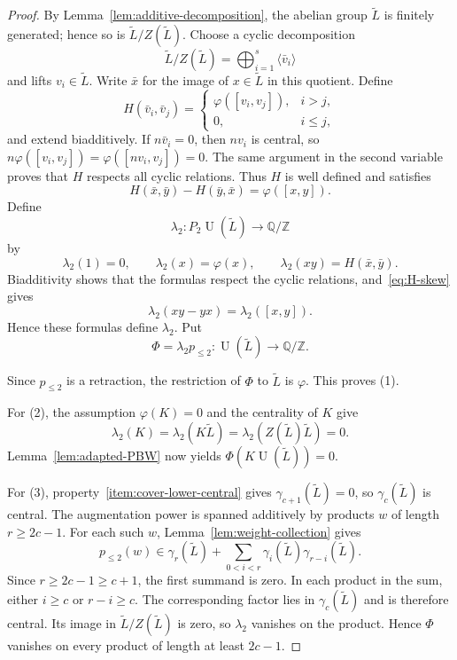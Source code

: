 \documentclass[a4paper,11pt,reqno]{amsart}
\theoremstyle{definition}
\newcommand{\Z}{\mathbb Z}
\newcommand{\Q}{\mathbb Q}
\newcommand{\D}{\Q/\Z}
\newcommand{\U}{\operatorname U}
\begin{document}
\begin{proof}
By Lemma~\ref{lem:additive-decomposition}, the abelian group $\widetilde L$
is finitely generated; hence so is $\widetilde L/Z(\widetilde L)$.  Choose
a cyclic decomposition
\[
 \widetilde L/Z(\widetilde L)
 =\bigoplus_{i=1}^s\langle\bar v_i\rangle
\]
and lifts $v_i\in\widetilde L$.  Write $\bar x$ for the image of
$x\in\widetilde L$ in this quotient.  Define
\[
 H(\bar v_i,\bar v_j)=
 \begin{cases}
  \varphi([v_i,v_j]),&i>j,\\
  0,&i\leq j,
 \end{cases}
\]
and extend biadditively.  If $n\bar v_i=0$, then $nv_i$ is central, so
$n\varphi([v_i,v_j])=\varphi([nv_i,v_j])=0$.  The same argument in the
second variable proves that $H$ respects all cyclic relations.  Thus $H$
is well defined and satisfies
\begin{equation}\label{eq:H-skew}
 H(\bar x,\bar y)-H(\bar y,\bar x)=\varphi([x,y]).
\end{equation}
Define
\[
 \lambda_2:P_2\U(\widetilde L)\longrightarrow\D
\]
by
\[
 \lambda_2(1)=0,
 \qquad
 \lambda_2(x)=\varphi(x),
 \qquad
 \lambda_2(xy)=H(\bar x,\bar y).
\]
Biadditivity shows that the formulas respect the cyclic relations,
and~\eqref{eq:H-skew} gives
\[
                  \lambda_2(xy-yx)=\lambda_2([x,y]).
\]
Hence these formulas define $\lambda_2$.  Put
\[
 \Phi=\lambda_2p_{\leq2}:
 \U(\widetilde L)\longrightarrow\D.
\]

Since $p_{\leq2}$ is a retraction, the restriction of
$\Phi$ to $\widetilde L$ is $\varphi$.  This proves (1).

For (2), the assumption $\varphi(K)=0$ and the centrality of $K$ give
\[
 \lambda_2(K)=\lambda_2(K\widetilde L)
 =\lambda_2(Z(\widetilde L)\widetilde L)=0.
\]
Lemma~\ref{lem:adapted-PBW} now yields
$\Phi(K\U(\widetilde L))=0$.

For (3), property~\ref{item:cover-lower-central} gives
$\gamma_{c+1}(\widetilde L)=0$, so
$\gamma_c(\widetilde L)$ is central.  The augmentation power is spanned
additively by products $w$ of length $r\geq2c-1$.  For each such $w$,
Lemma~\ref{lem:weight-collection} gives
\[
 p_{\leq2}(w)\in\gamma_r(\widetilde L)
 +\sum_{0<i<r}\gamma_i(\widetilde L)\gamma_{r-i}(\widetilde L).
\]
Since $r\geq2c-1\geq c+1$, the first summand is zero.  In each product in
the sum, either $i\geq c$ or $r-i\geq c$.  The corresponding factor lies in
$\gamma_c(\widetilde L)$ and is therefore central.  Its image in
$\widetilde L/Z(\widetilde L)$ is zero, so $\lambda_2$ vanishes on the
product.  Hence $\Phi$ vanishes on every product of length at
least $2c-1$.
\end{proof}
\end{document}
